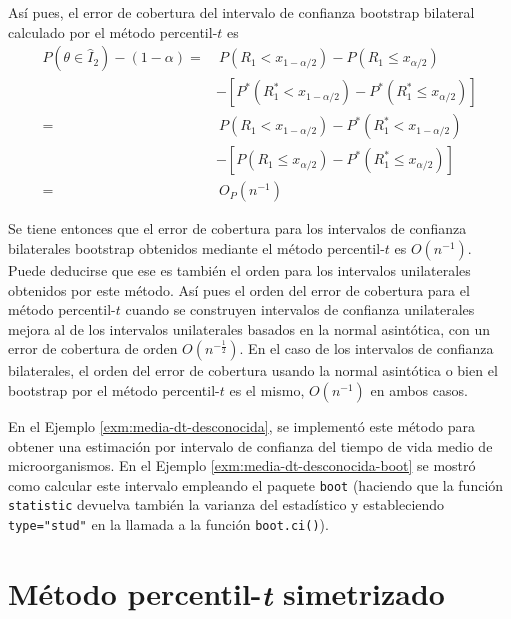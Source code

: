 \documentclass[]{book}
\theoremstyle{definition}
\theoremstyle{definition}
\theoremstyle{definition}
\theoremstyle{remark}
\begin{document}
Así pues, el error de cobertura del intervalo de confianza bootstrap
bilateral calculado por el método percentil-\(t\) es \[\begin{aligned}
P\left( \theta \in \hat{I}_2 \right) -\left( 1-\alpha \right) =&\  P\left(
R_1<x_{1-\alpha /2} \right) -P\left( R_1\leq x_{\alpha /2} \right) \\
& -\left[ P^{\ast}\left( R_1^{\ast}<x_{1-\alpha /2} \right) -P^{\ast
}\left( R_1^{\ast}\leq x_{\alpha /2} \right) \right] \\
=&\  P\left( R_1<x_{1-\alpha /2} \right) -P^{\ast}\left( R_1^{\ast
}<x_{1-\alpha /2} \right) \\
&-\left[ P\left( R_1\leq x_{\alpha /2} \right) -P^{\ast}\left(
R_1^{\ast}\leq x_{\alpha /2} \right) \right] \\
=&\  O_{P}\left( n^{-1} \right)
\end{aligned}\]

Se tiene entonces que el error de cobertura para los intervalos de
confianza bilaterales bootstrap obtenidos mediante el método
percentil-\(t\) es \(O\left( n^{-1} \right)\). Puede deducirse que ese
es también el orden para los intervalos unilaterales obtenidos por este
método. Así pues el orden del error de cobertura para el método
percentil-\(t\) cuando se construyen intervalos de confianza
unilaterales mejora al de los intervalos unilaterales basados en la
normal asintótica, con un error de cobertura de orden
\(O\left( n^{-\frac{1}{2}} \right)\). En el caso de los intervalos de
confianza bilaterales, el orden del error de cobertura usando la normal
asintótica o bien el bootstrap por el método percentil-\(t\) es el
mismo, \(O\left( n^{-1} \right)\) en ambos casos.

En el Ejemplo \ref{exm:media-dt-desconocida}, se implementó este método
para obtener una estimación por intervalo de confianza del tiempo de
vida medio de microorganismos. En el Ejemplo
\ref{exm:media-dt-desconocida-boot} se mostró como calcular este
intervalo empleando el paquete \texttt{boot} (haciendo que la función
\texttt{statistic} devuelva también la varianza del estadístico y
estableciendo \texttt{type="stud"} en la llamada a la función
\texttt{boot.ci()}).

\section{\texorpdfstring{Método percentil-\emph{t}
simetrizado}{Método percentil-t simetrizado}}\label{metodo-percentil-t-simetrizado}
\end{document}
